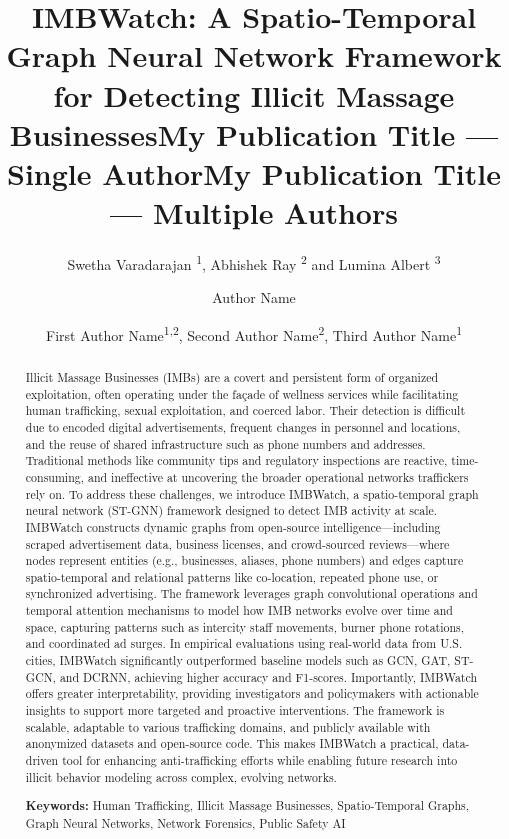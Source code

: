 \documentclass[letterpaper]{article} %
\title{IMBWatch: A Spatio-Temporal Graph Neural Network Framework \\ for Detecting Illicit Massage Businesses}
\author{
   Swetha Varadarajan \textsuperscript{\rm 1}, 
   Abhishek Ray \textsuperscript{\rm 2} and 
   Lumina Albert \textsuperscript{\rm 3} 
}
\title{My Publication Title --- Single Author}
\author {
    Author Name
}
\title{My Publication Title --- Multiple Authors}
\author {
    First Author Name\textsuperscript{\rm 1,\rm 2},
    Second Author Name\textsuperscript{\rm 2},
    Third Author Name\textsuperscript{\rm 1}
}
\begin{document}
\maketitle

\begin{abstract}
Illicit Massage Businesses (IMBs) are a covert and persistent form of organized exploitation, often operating under the façade of wellness services while facilitating human trafficking, sexual exploitation, and coerced labor. Their detection is difficult due to encoded digital advertisements, frequent changes in personnel and locations, and the reuse of shared infrastructure such as phone numbers and addresses. Traditional methods like community tips and regulatory inspections are reactive, time-consuming, and ineffective at uncovering the broader operational networks traffickers rely on. To address these challenges, we introduce IMBWatch, a spatio-temporal graph neural network (ST-GNN) framework designed to detect IMB activity at scale. IMBWatch constructs dynamic graphs from open-source intelligence—including scraped advertisement data, business licenses, and crowd-sourced reviews—where nodes represent entities (e.g., businesses, aliases, phone numbers) and edges capture spatio-temporal and relational patterns like co-location, repeated phone use, or synchronized advertising. The framework leverages graph convolutional operations and temporal attention mechanisms to model how IMB networks evolve over time and space, capturing patterns such as intercity staff movements, burner phone rotations, and coordinated ad surges. In empirical evaluations using real-world data from U.S. cities, IMBWatch significantly outperformed baseline models such as GCN, GAT, ST-GCN, and DCRNN, achieving higher accuracy and F1-scores. Importantly, IMBWatch offers greater interpretability, providing investigators and policymakers with actionable insights to support more targeted and proactive interventions. The framework is scalable, adaptable to various trafficking domains, and publicly available with anonymized datasets and open-source code. This makes IMBWatch a practical, data-driven tool for enhancing anti-trafficking efforts while enabling future research into illicit behavior modeling across complex, evolving networks.

\textbf{Keywords:} Human Trafficking, Illicit Massage Businesses, Spatio-Temporal Graphs, Graph Neural Networks, Network Forensics, Public Safety AI


\end{abstract}
\end{document}
